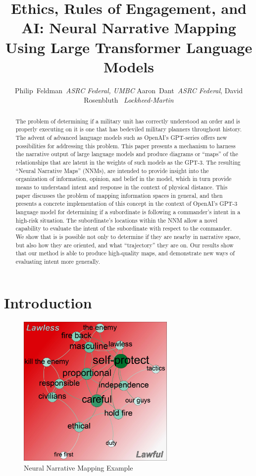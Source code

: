 \documentclass[11pt,dvipdfm]{article}
\begin{document}
\title{Ethics, Rules of Engagement, and AI: Neural Narrative Mapping Using Large Transformer Language Models}
\author{Philip~Feldman~\textit{ASRC Federal, UMBC}
        Aaron~Dant~\textit{ASRC Federal}, David Rosenbluth ~\textit{Lockheed-Martin}}%


\maketitle
\begin{abstract}
The problem of determining if a military unit has correctly understood an order and is properly executing on it is one that has bedeviled military planners throughout history. The advent of advanced language models such as OpenAI's GPT-series offers new possibilities for addressing this problem. This paper presents a mechanism to harness the narrative output of large language models and produce diagrams or \enquote{maps} of the relationships that are latent in the weights of such models as the GPT-3. The resulting \enquote{Neural Narrative Maps} (NNMs), are intended to provide insight into the organization of information, opinion, and belief in the model, which in turn  provide means to understand intent and response in the context of physical distance. This paper discusses the problem of mapping information spaces in general, and then presents a concrete implementation of this concept in the context of OpenAI's GPT-3 language model for determining if a subordinate is following a commander's intent in a high-risk situation. The subordinate's locations within the NNM allow a novel capability to evaluate the intent of the subordinate with respect to the commander. We show that is is possible not only to determine if they are nearby in narrative space, but also how they are oriented, and what \enquote{trajectory} they are on. Our results show that our method is able to produce high-quality maps, and demonstrate new ways of evaluating intent more generally.
\end{abstract}

\section{Introduction}
\label{sec:introduction}

\begin{figure}[!h]
	\centering
	\includegraphics[height = 20em]{figs/orders_final}
	\caption{\label{fig:example}Neural Narrative Mapping Example}
\end{figure}
\end{document}
